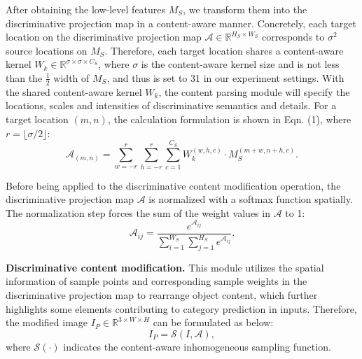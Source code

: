 \documentclass[letterpaper]{article} %
\begin{document}



After obtaining the low-level features $ M_S $, we transform them into the discriminative projection map in a content-aware manner. Concretely, each target location on the discriminative projection map $ \mathcal{A} \in \mathbb{R}^{H_S \times W_S} $ corresponds to $ \sigma^2 $ source locations on $ M_S $. Therefore, each target location shares a content-aware kernel $ W_k \in \mathbb{R}^{ \sigma \times \sigma \times C_S } $, where $ \sigma $ is the content-aware kernel size and is not less than the $ \frac{1}{2} $ width of $ M_S $, and thus is set to 31 in our experiment settings. With the shared content-aware kernel $ W_k $, the content parsing module will specify the locations, scales and intensities of discriminative semantics and details. For a target location $ (m, n) $, the calculation formulation is shown in Eqn. (1), where $ r = \lfloor \sigma/2\rfloor $: 
\begin{equation}
\mathcal{A}_{(m,n)} = \sum_{w=-r}^r\sum_{h=-r}^r \sum_{c=1}^{C_S} W_k^{(w,h,c)} \cdot M_S^{(m+w, n+h,c)}.
\end{equation}

Before being applied to the discriminative content modification operation, the discriminative projection map $ \mathcal{A} $ is normalized with a softmax function spatially. The normalization step forces the sum of the weight values in $ \mathcal{A} $ to 1:
\begin{equation}
 \mathcal{A}_{ij}= \frac{e^{\mathcal{A}_{ij}}}{\sum_{i=1}^{W_S}\sum_{j=1}^{H_S}e^{\mathcal{A}_{ij}}}.
\end{equation} 

\textbf{Discriminative content modification.}
This module utilizes the spatial information of sample points and corresponding sample weights in the discriminative projection map to rearrange object content, which further highlights some elements contributing to category prediction in inputs. Therefore, the modified image $ I_P \in\mathbb{R}^{3\times W \times H} $ can be formulated as below:
\begin{equation}
I_P = \mathcal{S}(I, \mathcal{A}),
\end{equation}
where $ \mathcal{S}(\cdot) $ indicates the content-aware inhomogeneous sampling function. 
\end{document}
